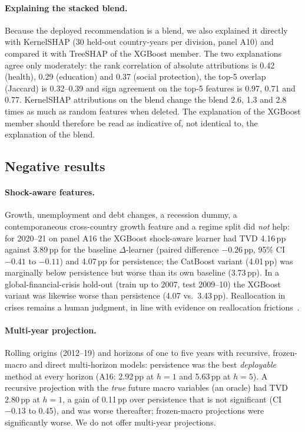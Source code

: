 \paragraph{Explaining the stacked blend.} Because the deployed recommendation is a blend, we also explained it directly with KernelSHAP (30 held-out country-years per division, panel A10) and compared it with TreeSHAP of the XGBoost member. The two explanations agree only moderately: the rank correlation of absolute attributions is 0.42 (health), 0.29 (education) and 0.37 (social protection), the top-5 overlap (Jaccard) is 0.32--0.39 and sign agreement on the top-5 features is 0.97, 0.71 and 0.77. KernelSHAP attributions on the blend change the blend 2.6, 1.3 and 2.8 times as much as random features when deleted. The explanation of the XGBoost member should therefore be read as indicative of, not identical to, the explanation of the blend.

\subsection{Negative results}\label{sec:neg}
\paragraph{Shock-aware features.} Growth, unemployment and debt changes, a recession dummy, a contemporaneous cross-country growth feature and a regime split did \emph{not} help: for 2020--21 on panel A16 the XGBoost shock-aware learner had TVD 4.16\,pp against 3.89\,pp for the baseline $\Delta$-learner (paired difference $-0.26$\,pp, 95\% CI $-0.41$ to $-0.11$) and 4.07\,pp for persistence; the CatBoost variant (4.01\,pp) was marginally below persistence but worse than its own baseline (3.73\,pp). In a global-financial-crisis hold-out (train up to 2007, test 2009--10) the XGBoost variant was likewise worse than persistence (4.07 vs.\ 3.43\,pp). Reallocation in crises remains a human judgment, in line with evidence on reallocation frictions~\cite{barnes2023}.
\paragraph{Multi-year projection.} Rolling origins (2012--19) and horizons of one to five years with recursive, frozen-macro and direct multi-horizon models: persistence was the best \emph{deployable} method at every horizon (A16: 2.92\,pp at $h=1$ and 5.63\,pp at $h=5$). A recursive projection with the \emph{true} future macro variables (an oracle) had TVD 2.80\,pp at $h=1$, a gain of 0.11\,pp over persistence that is not significant (CI $-0.13$ to 0.45), and was worse thereafter; frozen-macro projections were significantly worse. We do not offer multi-year projections.
